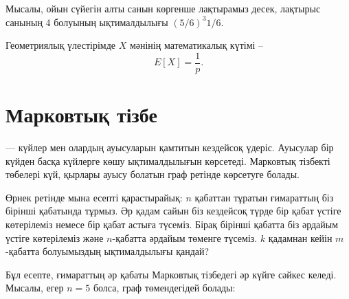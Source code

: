 Мысалы, ойын сүйегін алты санын көргенше лақтырамыз десек,
лақтырыс санының 4 болуының ықтималдылығы 
$(5/6)^3 1/6$.

Геометриялық үлестірімде $X$ мәнінің математикалық күтімі --
\[E[X]=\frac{1}{p}.\]

\section{Марковтық тізбе}


 –– күйлер мен олардың ауысуларын
қамтитын кездейсоқ үдеріс. Ауысулар бір күйден басқа күйлерге көшу ықтималдылығын көрсетеді. Марковтық тізбекті төбелері күй, қырлары ауысу болатын граф ретінде көрсетуге болады. 

Өрнек ретінде мына есепті қарастырайық:
$n$ қабаттан тұратын ғимараттың біз бірінші қабатында
тұрмыз. Әр қадам сайын біз кездейсоқ түрде бір қабат
үстіге көтерілеміз немесе бір қабат астыға түсеміз. Бірақ
бірінші қабатта біз әрдайым үстіге көтерілеміз және 
$n$-қабатта әрдайым төменге түсеміз. $k$ қадамнан кейін
$m$-қабатта болуымыздың ықтималдылығы қандай?

Бұл есепте, ғимараттың әр қабаты Марковтық тізбедегі әр
күйге сәйкес келеді. Мысалы, егер $n=5$ болса, граф төмендегідей
болады:

\begin{center}
\end{center}

